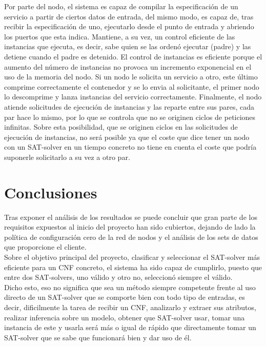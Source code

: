 \documentclass[11pt]{article}
\begin{document}
		Por parte del nodo, el sistema es capaz de compilar la especificación de un servicio a partir de ciertos datos de entrada, del mismo modo, 
		es capaz de, tras recibir la especificación de uno, ejecutarlo desde el punto de entrada  y abriendo los puertos que esta indica. Mantiene, a su vez,
		un control eficiente de las instancias que ejecuta, es decir, sabe quien se las ordenó ejecutar (padre) y las detiene cuando el padre es detenido.
		El control de instancias es eficiente porque el aumento del número de instancias no provoca un incremento exponencial en el uso de la memoria del nodo.
		Si un nodo le solicita un servicio a otro, este último comprime correctamente el contenedor y se lo envia al solicitante, el primer nodo lo descomprime y
		lanza instancias del servicio correctamente.
		Finalmente, el nodo atiende solicitudes de ejecución de instancias y las reparte entre sus pares, cada par hace lo mismo, por lo que se controla que no
		se originen ciclos de peticiones infinitas. Sobre esta posibilidad, que se originen ciclos en las solicitudes de ejecución de instancias,
		no será posible ya que el coste que dice tener un nodo con un SAT-solver en un tiempo concreto no tiene en cuenta 
		el coste que podría suponerle solicitarlo a su vez a otro par. \\	

	\section{Conclusiones}
		Tras exponer el análisis de los resultados se puede concluir que gran parte de los requisitos expuestos al inicio del proyecto han sido cubiertos, dejando de lado la política
		de configuración cero de la red de nodos y el análisis de los sets de datos que proporcione el cliente. \\
		
		Sobre el objetivo principal del proyecto, clasificar y seleccionar el 
		SAT-solver más eficiente para un CNF concreto, el sistema ha sido capaz de cumplirlo, puesto que entre dos SAT-solvers, uno válido y otro no, seleccionó siempre el válido. \\ 
		Dicho esto, eso no significa que sea un método siempre competente frente al uso directo de un SAT-solver que se comporte bien con todo tipo de entradas, es decir, 
		dificilmente la tarea de recibir un CNF, analizarlo y
		extraer sus atributos, realizar inferencia sobre un modelo, obtener que SAT-solver usar, tomar una instancia de este y usarla será más o igual de rápido que directamente tomar un SAT-solver
		que se sabe que funcionará bien y dar uso de él. \\
		
\end{document}
